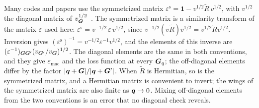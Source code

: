 Many codes and papers use the symmetrized matrix $\varepsilon^{\mathrm{s}} = \mathbf{1} - v^{1/2}\tilde R\,v^{1/2}$, with $v^{1/2}$ the diagonal matrix of $v_{\bm{G}}^{1/2}$~\cite[footnote~3]{knapen2021dark}. The symmetrized matrix is a similarity transform of the matrix $\varepsilon$ used here: $\varepsilon^{\mathrm{s}} = v^{-1/2}\,\varepsilon\,v^{1/2}$, since $v^{-1/2}(v\tilde R)v^{1/2} = v^{1/2}\tilde Rv^{1/2}$. Inversion gives $(\varepsilon^{\mathrm{s}})^{-1} = v^{-1/2}\varepsilon^{-1}v^{1/2}$, and the elements of this inverse are $(\varepsilon^{-1})_{\bm{G}\bm{G}'}(v_{\bm{G}'}/v_{\bm{G}})^{1/2}$. The diagonal elements are the same in both conventions, and they give $\varepsilon_{\mathrm{mac}}$ and the loss function at every $\bm{G}_q$; the off-diagonal elements differ by the factor $|\bm{q}+\bm{G}|/|\bm{q}+\bm{G}'|$. When $\tilde R$ is Hermitian, so is the symmetrized matrix, and a Hermitian matrix is convenient to invert; the wings of the symmetrized matrix are also finite as $\bm{q} \to 0$. Mixing off-diagonal elements from the two conventions is an error that no diagonal check reveals.
